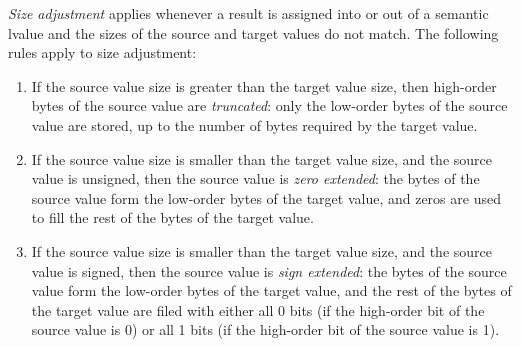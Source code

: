 \documentclass[10pt]{article}
\begin{document}
\emph{Size adjustment} applies whenever a result is assigned into or
out of a semantic lvalue and the sizes of the source and target values
do not match.  The following rules apply to size adjustment:
%
\begin{enumerate}
%
\item If the source value size is greater than the target value size,
  then high-order bytes of the source value are \emph{truncated}: only
  the low-order bytes of the source value are stored, up to the number
  of bytes required by the target value.
%
\item If the source value size is smaller than the target value size,
  and the source value is unsigned, then the source value is
  \emph{zero extended}:  the bytes of the source value form the
  low-order bytes of the target value, and zeros are used to fill the
  rest of the bytes of the target value.
%
\item If the source value size is smaller than the target value size,
  and the source value is signed, then the source value is \emph{sign
    extended}: the bytes of the source value form the low-order bytes
  of the target value, and the rest of the bytes of the target value
  are filed with either all 0 bits (if the high-order bit of the
  source value is 0) or all 1 bits (if the high-order bit of the
  source value is 1).
%
\end{enumerate}
\end{document}

